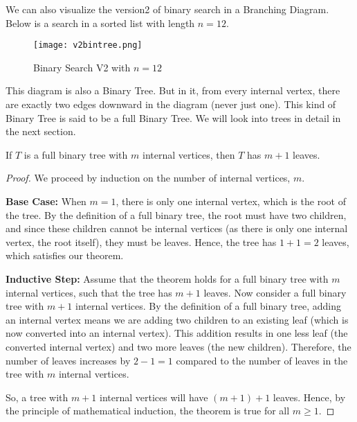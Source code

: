     We can also visualize the version2 of binary search in a Branching Diagram. Below is a search
    in a sorted list with length $n=12$.
    \begin{figure}[h]
        \centering
        \texttt{[image: v2bintree.png]}
        \caption{Binary Search V2 with $n=12$}
    \end{figure}
    This diagram is also a Binary Tree. But in it, from every internal vertex, there
    are exactly two edges downward in the diagram (never just one). This kind of
    Binary Tree is said to be a full Binary Tree. We will look into trees in detail in the next section.
    \begin{theorem}
        If \( T \) is a full binary tree with \( m \) internal vertices, then \( T \) has \( m + 1 \) leaves.
        \end{theorem}
        
        \begin{proof}
        We proceed by induction on the number of internal vertices, \( m \).
        
        \textbf{Base Case:} When \( m = 1 \), there is only one internal vertex, which is the root of the tree. By the definition of a full binary tree, the root must have two children, and since these children cannot be internal vertices (as there is only one internal vertex, the root itself), they must be leaves. Hence, the tree has \( 1 + 1 = 2 \) leaves, which satisfies our theorem.
        
        \textbf{Inductive Step:} Assume that the theorem holds for a full binary tree with \( m \) internal vertices, such that the tree has \( m + 1 \) leaves. Now consider a full binary tree with \( m + 1 \) internal vertices. By the definition of a full binary tree, adding an internal vertex means we are adding two children to an existing leaf (which is now converted into an internal vertex). This addition results in one less leaf (the converted internal vertex) and two more leaves (the new children). Therefore, the number of leaves increases by \( 2 - 1 = 1 \) compared to the number of leaves in the tree with \( m \) internal vertices.
        
        So, a tree with \( m + 1 \) internal vertices will have \( (m + 1) + 1 \) leaves. Hence, by the principle of mathematical induction, the theorem is true for all \( m \geq 1 \).
        \end{proof}

